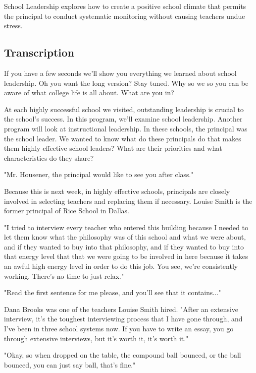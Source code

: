 School Leadership explores how to create a positive school climate that permits the principal to conduct systematic monitoring without causing teachers undue stress.

\subsection{Transcription}

If you have a few seconds we'll show you everything we learned about school leadership.
Oh you want the long version?
Stay tuned.
Why so we so you can be aware of what college life is all about.
What are you in?

At each highly successful school we visited, outstanding leadership is crucial to the school's success.
In this program, we'll examine school leadership.
Another program will look at instructional leadership.
In these schools, the principal was the school leader.
We wanted to know what do these principals do that makes them highly effective school leaders?
What are their priorities and what characteristics do they share?

"Mr.
Housener, the principal would like to see you after class."

Because this is next week, in highly effective schools, principals are closely involved in selecting teachers and replacing them if necessary.
Louise Smith is the former principal of Rice School in Dallas.

"I tried to interview every teacher who entered this building because I needed to let them know what the philosophy was of this school and what we were about, and if they wanted to buy into that philosophy, and if they wanted to buy into that energy level that that we were going to be involved in here because it takes an awful high energy level in order to do this job.
You see, we're consistently working.
There's no time to just relax."

"Read the first sentence for me please, and you'll see that it contains..."

Dana Brooks was one of the teachers Louise Smith hired.
"After an extensive interview, it's the toughest interviewing process that I have gone through, and I've been in three school systems now.
If you have to write an essay, you go through extensive interviews, but it's worth it, it's worth it."

"Okay, so when dropped on the table, the compound ball bounced, or the ball bounced, you can just say ball, that's fine."

